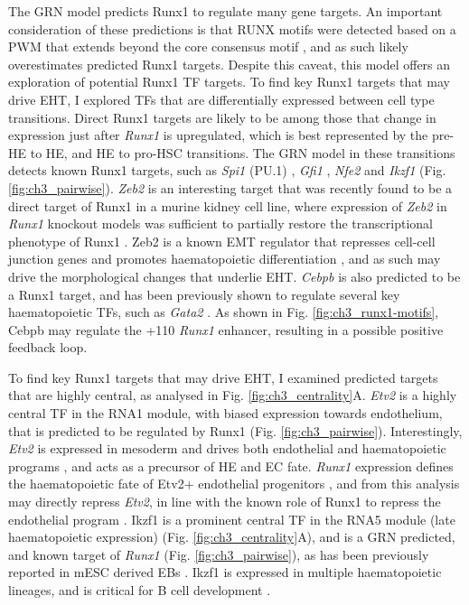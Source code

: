 The GRN model predicts Runx1 to regulate many gene targets. An important consideration of these predictions is that RUNX motifs were detected based on a PWM that extends beyond the core consensus motif \citep{kulakovskiy_hocomoco_2018}, and as such likely overestimates predicted Runx1 targets. Despite this caveat, this model offers an exploration of potential Runx1 TF targets. To find key Runx1 targets that may drive EHT, I explored TFs that are differentially expressed between cell type transitions. Direct Runx1 targets are likely to be among those that change in expression just after \textit{Runx1} is upregulated, which is best represented by the pre-HE to HE, and HE to pro-HSC transitions. The GRN model in these transitions detects known Runx1 targets, such as \textit{Spi1} (PU.1) \citep{huang_pu1_2008}, \textit{Gfi1} \citep{wilson_gfi1_2010}, \textit{Nfe2} \citep{wang_aml1_2010} and \textit{Ikzf1} \citep{iacovino_hoxa3_2011} (Fig. \ref{fig:ch3_pairwise}). \textit{Zeb2} is an interesting target that was recently found to be a direct target of Runx1 in a murine kidney cell line, where expression of \textit{Zeb2} in \textit{Runx1} knockout models was sufficient to partially restore the transcriptional phenotype of Runx1 \citep{hass_runx1_2021}. Zeb2 is a known EMT regulator that represses cell-cell junction genes and promotes haematopoietic differentiation \citep{vandewalle_sip1zeb2_2005, li_emt_2017}, and as such may drive the morphological changes that underlie EHT. \textit{Cebpb} is also predicted to be a Runx1 target, and has been previously shown to regulate several key haematopoietic TFs, such as \textit{Gata2} \citep{goode_dynamic_2016}. As shown in Fig. \ref{fig:ch3_runx1-motifs}, Cebpb may regulate the +110 \textit{Runx1} enhancer, resulting in a possible positive feedback loop.

To find key Runx1 targets that may drive EHT, I examined predicted targets that are highly central, as analysed in Fig. \ref{fig:ch3_centrality}A. \textit{Etv2} is a highly central TF in the RNA1 module, with biased expression towards endothelium, that is predicted to be regulated by Runx1 (Fig. \ref{fig:ch3_pairwise}). Interestingly, \textit{Etv2} is expressed in mesoderm and drives both endothelial and haematopoietic programs \citep{liu_induction_2015, menegatti_transcriptional_2019}, and acts as a precursor of HE and EC fate. \textit{Runx1} expression defines the haematopoietic fate of Etv2+ endothelial progenitors \citep{eliades_hemogenic_2016}, and from this analysis may directly repress \textit{Etv2}, in line with the known role of Runx1 to repress the endothelial program \citep{lancrin_gfi1_2012}. Ikzf1 is a prominent central TF in the RNA5 module (late haematopoietic expression) (Fig. \ref{fig:ch3_centrality}A), and is a GRN predicted, and known target of \textit{Runx1} (Fig. \ref{fig:ch3_pairwise}), as has been previously reported in mESC derived EBs \citep{iacovino_hoxa3_2011}. Ikzf1 is expressed in multiple haematopoietic lineages, and is critical for B cell development \citep{nichogiannopoulou_defects_1999,georgopoulos_making_2017,marke_many_2018}. 

